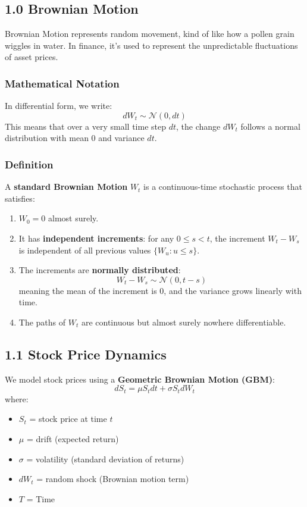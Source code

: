 \documentclass[12pt]{article}
\begin{document}
\subsection{1.0 Brownian Motion}
Brownian Motion represents random movement, kind of like how a pollen grain wiggles in water.  
In finance, it’s used to represent the unpredictable fluctuations of asset prices.
\subsubsection*{Mathematical Notation}
In differential form, we write:
\[
    dW_t \sim \mathcal{N}(0, dt)
\]
This means that over a very small time step $dt$, the change $dW_t$ follows a normal distribution with mean $0$ and variance $dt$.
\subsubsection*{Definition}
A \textbf{standard Brownian Motion} $W_t$ is a continuous-time stochastic process that satisfies:
\begin{enumerate}
    \item $W_0 = 0$ almost surely.
    \item It has \textbf{independent increments}: for any $0 \leq s < t$, the increment $W_t - W_s$ is independent of all previous values $\{W_u : u \leq s\}$.
    \item The increments are \textbf{normally distributed}:
    \[
        W_t - W_s \sim \mathcal{N}(0, t-s)
    \]
    meaning the mean of the increment is $0$, and the variance grows linearly with time.
    \item The paths of $W_t$ are continuous but almost surely nowhere differentiable.
\end{enumerate}


\subsection{1.1 Stock Price Dynamics}
We model stock prices using a \textbf{Geometric Brownian Motion (GBM)}:
\[
dS_t = \mu S_t dt + \sigma S_t dW_t
\]
where:
\begin{itemize}
    \item $S_t$ = stock price at time $t$
    \item $\mu$ = drift (expected return)
    \item $\sigma$ = volatility (standard deviation of returns)
    \item $dW_t$ = random shock (Brownian motion term)
    \item $T$ = Time 
\end{itemize}
\end{document}
